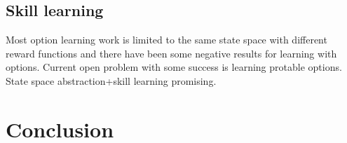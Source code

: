 \subsection{Skill learning}
Most option learning work is limited to the same state space with different reward functions and there have been some negative results for learning with options. Current open problem with some success is learning protable options. State space abstraction+skill learning promising.


\section{Conclusion}


